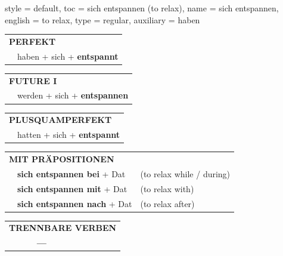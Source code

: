 \begin{verbentry}{
  style = {default},
  toc = {sich entspannen (to relax)},
  name = {sich entspannen},
  english = {to relax},
  type = {regular},
  auxiliary = {haben}
}
 \begin{tabular}{rl}
     \multicolumn{2}{l}{\textbf{PERFEKT}}\\
   & haben + sich + \textbf{entspannt}\\
  \end{tabular}
\hfill
   \begin{tabular}{rl}
   
    \multicolumn{2}{l}{\textbf{FUTURE I} }\\
   & werden + sich + \textbf{entspannen}\\
 
  \end{tabular}
\hfill
   \begin{tabular}{rl}
      \multicolumn{2}{l}{\textbf{PLUSQUAMPERFEKT}}\\
   & hatten + sich + \textbf{entspannt}\\
  \end{tabular}

   \vspace{10pt}

   \begin{tabular}{lll}
      \multicolumn{3}{l}{\textbf{MIT PRÄPOSITIONEN}}\\
& \textbf{sich entspannen bei} + Dat & (to relax while / during)\\
& \textbf{sich entspannen mit} + Dat & (to relax with)\\
& \textbf{sich entspannen nach} + Dat & (to relax after)\\
\end{tabular}
  \hfill
\begin{tabular}{lll}
\multicolumn{3}{l}{\textbf{TRENNBARE VERBEN}}\\
& \textbf{---} & \\
\end{tabular}


  \vspace{-5pt}
\end{verbentry}

